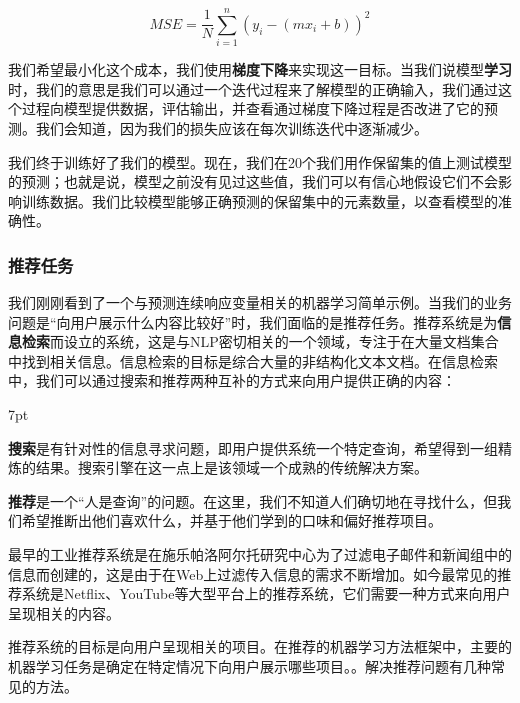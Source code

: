 \documentclass[Chinese, 11pt, table]{diazessay} %
\newenvironment{formal}{%
  \def\FrameCommand{%
	\hspace{1pt}%
	{\color{w_lightblue}\vrule width 2pt}%
	{\color{formalshade}\vrule width 4pt}%
	\colorbox{formalshade}%
  }%
  \MakeFramed{\advance\hsize-\width\FrameRestore}%
  \noindent\hspace{-4.55pt}%
  \begin{adjustwidth}{}{7pt}%
  \vspace{2pt}\vspace{2pt}%
}
{%
  \vspace{2pt}\end{adjustwidth}\endMakeFramed%
}
\begin{document}
\begin{CJK}{UTF8}{gbsn}
\begin{sloppypar}
\begin{equation}
MSE =  \frac{1}{N} \sum_{i=1}^{n} (y_i - (m x_i + b))^2
\end{equation}

我们希望最小化这个成本，我们使用\textbf{梯度下降}来实现这一目标。当我们说模型\textbf{学习}时，我们的意思是我们可以通过一个迭代过程来了解模型的正确输入，我们通过这个过程向模型提供数据，评估输出，并查看通过梯度下降过程是否改进了它的预测。我们会知道，因为我们的损失应该在每次训练迭代中逐渐减少。

我们终于训练好了我们的模型。现在，我们在20个我们用作保留集的值上测试模型的预测；也就是说，模型之前没有见过这些值，我们可以有信心地假设它们不会影响训练数据。我们比较模型能够正确预测的保留集中的元素数量，以查看模型的准确性。

\subsubsection{推荐任务}

我们刚刚看到了一个与预测连续响应变量相关的机器学习简单示例。当我们的业务问题是“向用户展示什么内容比较好”时，我们面临的是推荐任务。推荐系统是为\textbf{信息检索}而设立的系统，这是与NLP密切相关的一个领域，专注于在大量文档集合中找到相关信息。信息检索的目标是综合大量的非结构化文本文档。在信息检索中，我们可以通过搜索和推荐两种互补的方式来向用户提供正确的内容：

\begin{formal}
\textbf{搜索}是有针对性的信息寻求问题，即用户提供系统一个特定查询，希望得到一组精炼的结果。搜索引擎在这一点上是该领域一个成熟的传统解决方案。

\textbf{推荐}是一个“人是查询”的问题。在这里，我们不知道人们确切地在寻找什么，但我们希望推断出他们喜欢什么，并基于他们学到的口味和偏好推荐项目。
\end{formal}

最早的工业推荐系统是在施乐帕洛阿尔托研究中心为了过滤电子邮件和新闻组中的信息而创建的，这是由于在Web上过滤传入信息的需求不断增加。如今最常见的推荐系统是Netflix、YouTube等大型平台上的推荐系统，它们需要一种方式来向用户呈现相关的内容。

推荐系统的目标是向用户呈现相关的项目。在推荐的机器学习方法框架中，主要的机器学习任务是确定在特定情况下向用户展示哪些项目。\citep{castells2023recommender}。解决推荐问题有几种常见的方法。


\end{sloppypar}
\end{CJK}
\end{document}
